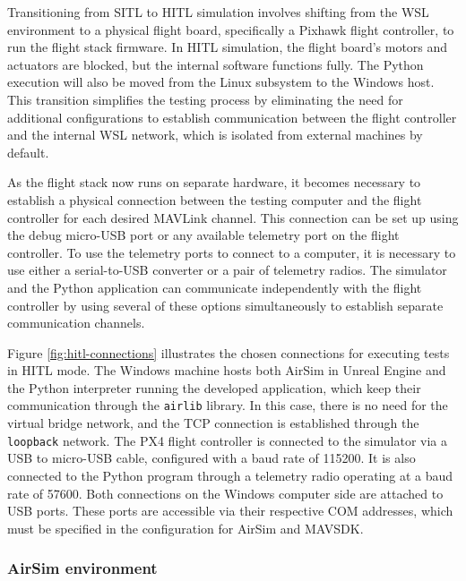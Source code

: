 Transitioning from SITL to HITL simulation involves shifting from the WSL environment to a physical flight board, specifically a Pixhawk flight controller, to run the flight stack firmware. In HITL simulation, the flight board's motors and actuators are blocked, but the internal software functions fully. The Python execution will also be moved from the Linux subsystem to the Windows host. This transition simplifies the testing process by eliminating the need for additional configurations to establish communication between the flight controller and the internal WSL network, which is isolated from external machines by default.

As the flight stack now runs on separate hardware, it becomes necessary to establish a physical connection between the testing computer and the flight controller for each desired MAVLink channel. This connection can be set up using the debug micro-USB port or any available telemetry port on the flight controller. To use the telemetry ports to connect to a computer, it is necessary to use either a serial-to-USB converter or a pair of telemetry radios. The simulator and the Python application can communicate independently with the flight controller by using several of these options simultaneously to establish separate communication channels.

Figure \ref{fig:hitl-connections} illustrates the chosen connections for executing tests in HITL mode. The Windows machine hosts both AirSim in Unreal Engine and the Python interpreter running the developed application, which keep their communication through the \texttt{airlib} library. In this case, there is no need for the virtual bridge network, and the TCP connection is established through the \texttt{loopback} network. The PX4 flight controller is connected to the simulator via a USB to micro-USB cable, configured with a baud rate of 115200. It is also connected to the Python program through a telemetry radio operating at a baud rate of 57600. Both connections on the Windows computer side are attached to USB ports. These ports are accessible via their respective COM addresses, which must be specified in the configuration for AirSim and MAVSDK.


\subsubsection{AirSim environment}

